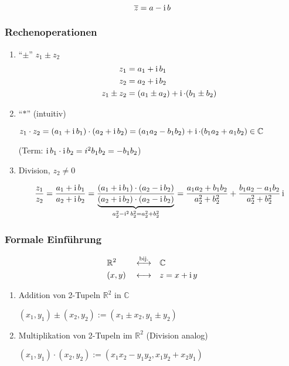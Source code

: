 \begin{definition}
 \[ \overline{z} = a - \operatorname{i} b \]
\end{definition}

\subsubsection*{Rechenoperationen}

\begin{enumerate}

\item ``$\pm$'' $z_1 \pm z_2$
\begin{align*}
z_1 & = a_1 + \operatorname{i} b_1 \\ 
z_2 & = a_2 + \operatorname{i} b_2 \\
z_1 \pm z_2 & = (a_1 \pm a_2) + \operatorname{i} \cdot (b_1 \pm b_2)
\end{align*}

\item ``$\ast$'' (intuitiv)

$z_1 \cdot z_2 = (a_1 + \operatorname{i} b_1) \cdot (a_2 + \operatorname{i} b_2) = (a_1 a_2 - b_1 b_2) + \operatorname{i} \cdot (b_1 a_2 + a_1 b_2) \in \mathbb{C}$

(Term: $\operatorname{i} b_1 \cdot \operatorname{i} b_2 = i^2 b_1 b_2 = - b_1 b_2$)

\item Division, $z_2 \neq 0$

$$ \frac{z_1}{z_2} = \frac{a_1 + \operatorname{i} b_1}{a_2 + \operatorname{i} b_2} = \frac{(a_1 + \operatorname{i} b_1) \cdot (a_2 - \operatorname{i} b_2)}{\underbrace{(a_2 + \operatorname{i} b_2) \cdot (a_2 - \operatorname{i} b_2)}_{a_2^2 - \operatorname{i}^2 b_2^2 = a_2^2 + b_2^2}} = \frac{a_1 a_2 + b_1 b_2}{a_2^2 + b_2^2} + \frac{b_1 a_2 - a_1 b_2}{a_2^2 + b_2^2} \operatorname{i} $$

\end{enumerate}

\subsubsection*{Formale Einführung}
\begin{alignat*}{3}
& \mathbb{R}^2 && \overset{\text{bij.}}{\longleftrightarrow} && \mathbb{C} \\
& (x, y) && \longleftrightarrow && z = x + \operatorname{i} y
\end{alignat*}
\begin{enumerate}
\item Addition von 2-Tupeln $\mathbb{R}^2$ in $\mathbb{C}$

$(x_1, y_1) \pm (x_2, y_2) := (x_1 \pm x_2, y_1 \pm y_2)$

\item Multiplikation von 2-Tupeln im $\mathbb{R}^2$ (Division analog)

$ (x_1, y_1) \cdot (x_2, y_2) := (x_1 x_2 - y_1 y_2, x_1 y_2 + x_2 y_1)$
\end{enumerate}

